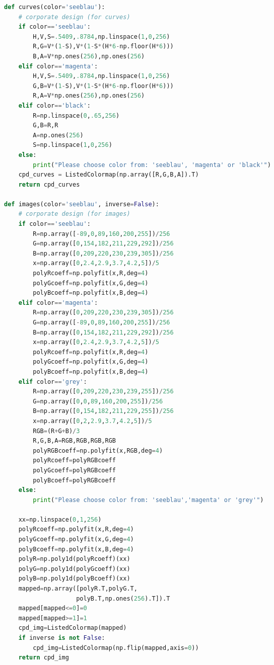 \begin{landscape}
\begin{multicols}{2}
\begin{lstlisting}[language=Python]
def curves(color='seeblau'):
    # corporate design (for curves)
    if color=='seeblau':
        H,V,S=.5409,.8784,np.linspace(1,0,256)
        R,G=V*(1-S),V*(1-S*(H*6-np.floor(H*6)))
        B,A=V*np.ones(256),np.ones(256)
    elif color=='magenta':
        H,V,S=.5409,.8784,np.linspace(1,0,256)
        G,B=V*(1-S),V*(1-S*(H*6-np.floor(H*6)))
        R,A=V*np.ones(256),np.ones(256)
    elif color=='black':
        R=np.linspace(0,.65,256)
        G,B=R,R
        A=np.ones(256)
        S=np.linspace(1,0,256)
    else:
        print("Please choose color from: 'seeblau', 'magenta' or 'black'")
    cpd_curves = ListedColormap(np.array([R,G,B,A]).T) 
    return cpd_curves

def images(color='seeblau', inverse=False):
    # corporate design (for images)
    if color=='seeblau':
        R=np.array([-89,0,89,160,200,255])/256
        G=np.array([0,154,182,211,229,292])/256
        B=np.array([0,209,220,230,239,305])/256
        x=np.array([0,2.4,2.9,3.7,4.2,5])/5
        polyRcoeff=np.polyfit(x,R,deg=4)
        polyGcoeff=np.polyfit(x,G,deg=4)
        polyBcoeff=np.polyfit(x,B,deg=4)
    elif color=='magenta':
        R=np.array([0,209,220,230,239,305])/256
        G=np.array([-89,0,89,160,200,255])/256
        B=np.array([0,154,182,211,229,292])/256
        x=np.array([0,2.4,2.9,3.7,4.2,5])/5
        polyRcoeff=np.polyfit(x,R,deg=4)
        polyGcoeff=np.polyfit(x,G,deg=4)
        polyBcoeff=np.polyfit(x,B,deg=4)
    elif color=='grey':
        R=np.array([0,209,220,230,239,255])/256
        G=np.array([0,0,89,160,200,255])/256
        B=np.array([0,154,182,211,229,255])/256
        x=np.array([0,2,2.9,3.7,4.2,5])/5
        RGB=(R+G+B)/3
        R,G,B,A=RGB,RGB,RGB,RGB
        polyRGBcoeff=np.polyfit(x,RGB,deg=4)
        polyRcoeff=polyRGBcoeff
        polyGcoeff=polyRGBcoeff
        polyBcoeff=polyRGBcoeff
    else:
        print("Please choose color from: 'seeblau','magenta' or 'grey'")
    
    xx=np.linspace(0,1,256)
    polyRcoeff=np.polyfit(x,R,deg=4)
    polyGcoeff=np.polyfit(x,G,deg=4)
    polyBcoeff=np.polyfit(x,B,deg=4)
    polyR=np.poly1d(polyRcoeff)(xx)
    polyG=np.poly1d(polyGcoeff)(xx)
    polyB=np.poly1d(polyBcoeff)(xx)
    mapped=np.array([polyR.T,polyG.T,
                    polyB.T,np.ones(256).T]).T
    mapped[mapped<=0]=0
    mapped[mapped>=1]=1
    cpd_img=ListedColormap(mapped)
    if inverse is not False:
        cpd_img=ListedColormap(np.flip(mapped,axis=0))
    return cpd_img
\end{lstlisting}
\end{multicols}
\end{landscape}